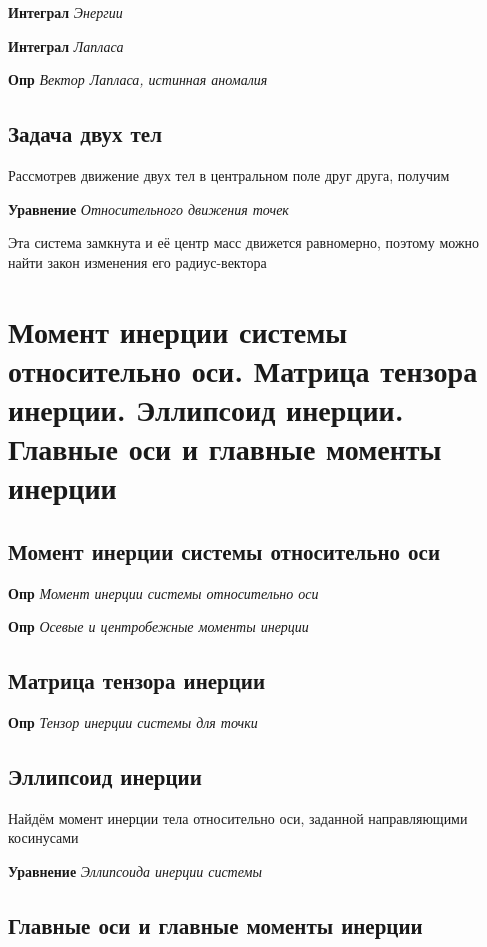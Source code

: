 \documentclass[a4paper, 14pt]{article}
\begin{document}
    \textbf{Интеграл} \textit{Энергии}
    
    \textbf{Интеграл} \textit{Лапласа}
    
    \textbf{Опр} \textit{Вектор Лапласа, истинная аномалия}
    
    \subsection{Задача двух тел}
    
    Рассмотрев движение двух тел в центральном поле друг друга, получим
    
    \textbf{Уравнение} \textit{Относительного движения точек}
    
    Эта система замкнута и её центр масс движется равномерно, поэтому можно найти закон изменения его радиус-вектора
    
    \section{Момент инерции системы относительно оси.
    Матрица тензора инерции.
    Эллипсоид инерции.
    Главные оси и главные моменты инерции}
    
    \subsection{Момент инерции системы относительно оси}
    
    \textbf{Опр} \textit{Момент инерции системы относительно оси}
    
    \textbf{Опр} \textit{Осевые и центробежные моменты инерции}
    
    \subsection{Матрица тензора инерции}
    
    \textbf{Опр} \textit{Тензор инерции системы для точки}
    
    \subsection{Эллипсоид инерции}
    
    Найдём момент инерции тела относительно оси, заданной направляющими косинусами
    
    \textbf{Уравнение} \textit{Эллипсоида инерции системы}
    
    \subsection{Главные оси и главные моменты инерции}
    
\end{document}
